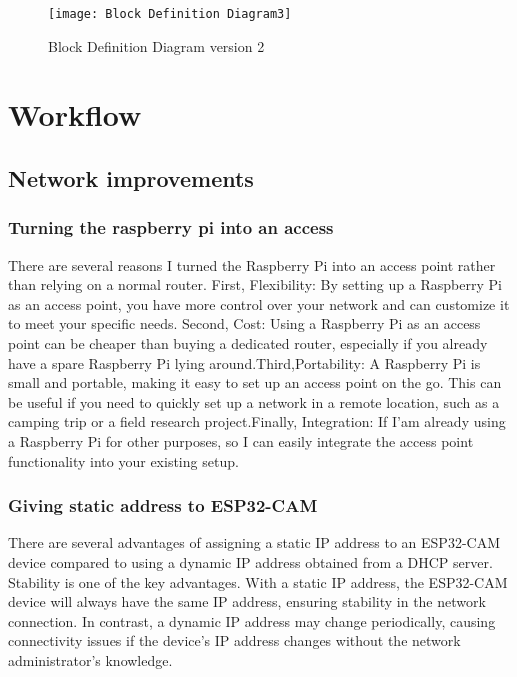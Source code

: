 \FloatBarrier
\FloatBarrier
\begin{figure}[h]
\FloatBarrier
         \centering
        \texttt{[image: Block Definition Diagram3]}
   
        \caption{Block Definition Diagram version 2}
        \label{Block Definition Diagram version 2}
\FloatBarrier
    \end{figure}


\FloatBarrier
\section{Workflow}
\subsection{Network improvements}
\subsubsection{Turning the raspberry pi into an access}
There are several reasons I turned the Raspberry Pi into an access point rather than relying on a normal router. First, Flexibility: By setting up a Raspberry Pi as an access point, you have more control over your network and can customize it to meet your specific needs. Second, Cost: Using a Raspberry Pi as an access point can be cheaper than buying a dedicated router, especially if you already have a spare Raspberry Pi lying around.Third,Portability: A Raspberry Pi is small and portable, making it easy to set up an access point on the go. This can be useful if you need to quickly set up a network in a remote location, such as a camping trip or a field research project.Finally, Integration: If I'am already using a Raspberry Pi for other purposes, so I can easily integrate the access point functionality into your existing setup.\cite{AG19}
\subsubsection{Giving static address to ESP32-CAM}
There are several advantages of assigning a static IP address to an ESP32-CAM device compared to using a dynamic IP address obtained from a DHCP server. Stability is one of the key advantages. With a static IP address, the ESP32-CAM device will always have the same IP address, ensuring stability in the network connection. In contrast, a dynamic IP address may change periodically, causing connectivity issues if the device's IP address changes without the network administrator's knowledge.\cite{HW22}

